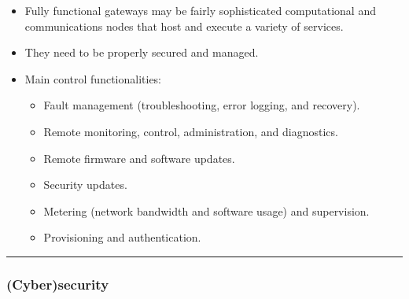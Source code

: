 \documentclass[
]{article}
\providecommand{\tightlist}{%
  \setlength{\itemsep}{0pt}\setlength{\parskip}{0pt}}
\begin{document}
\begin{itemize}
\tightlist
\item
  Fully functional gateways may be fairly sophisticated computational
  and communications nodes that host and execute a variety of services.
\item
  They need to be properly secured and managed.
\item
  Main control functionalities:

  \begin{itemize}
  \tightlist
  \item
    Fault management (troubleshooting, error logging, and recovery).
  \item
    Remote monitoring, control, administration, and diagnostics.
  \item
    Remote firmware and software updates.
  \item
    Security updates.
  \item
    Metering (network bandwidth and software usage) and supervision.
  \item
    Provisioning and authentication.
  \end{itemize}
\end{itemize}

\begin{center}\rule{0.5\linewidth}{0.5pt}\end{center}

\subsubsection{(Cyber)security}\label{cybersecurity}
\end{document}
